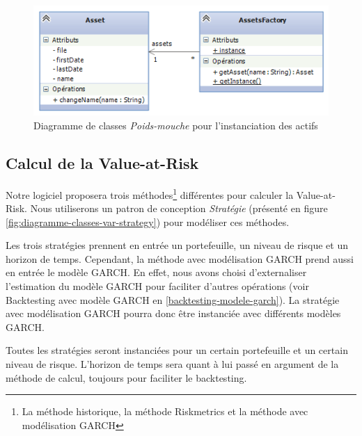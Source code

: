 \documentclass[a4paper,titlepage,french]{report}
\begin{document}
\begin{figure}
  	\center
  	\includegraphics[width=1\textwidth]{diagramme-classes-flyweight.png}
  	\caption{Diagramme de classes \textit{Poids-mouche} pour l'instanciation des actifs}
  	\label{fig:diagramme-classes-flyweight}
\end{figure}


\subsection{Calcul de la Value-at-Risk}

Notre logiciel proposera trois méthodes\footnote{La méthode historique, la méthode Riskmetrics et la méthode avec modélisation GARCH} différentes pour calculer la Value-at-Risk.
Nous utiliserons un patron de conception \textit{Stratégie} (présenté en figure \ref{fig:diagramme-classes-var-strategy}) pour modéliser ces méthodes.

Les trois stratégies prennent en entrée un portefeuille, un niveau de risque et un horizon de temps.
Cependant, la méthode avec modélisation GARCH prend aussi en entrée le modèle GARCH.
En effet, nous avons choisi d'externaliser l'estimation du modèle GARCH pour faciliter d'autres opérations (voir Backtesting avec modèle GARCH en \ref{backtesting-modele-garch}).
La stratégie avec modélisation GARCH pourra donc être instanciée avec différents modèles GARCH.

Toutes les stratégies seront instanciées pour un certain portefeuille et un certain niveau de risque.
L'horizon de temps sera quant à lui passé en argument de la méthode de calcul, toujours pour faciliter le backtesting.
\end{document}
